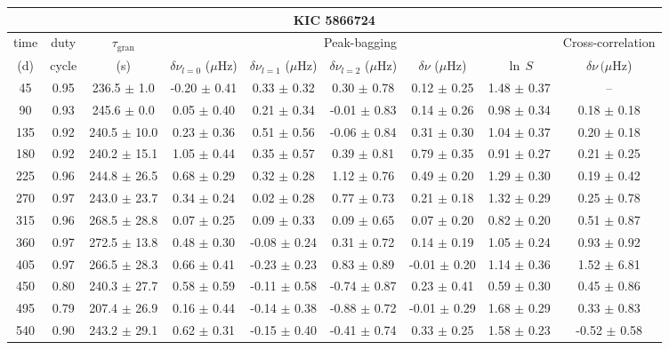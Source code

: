 \documentclass[twocolumn]{aastex61}%
\begin{document}
\begin{table}[ht]\centering\fontsize{9.}{7.}\selectfont
\begin{tabular}{ccc|ccccc|c}
\multicolumn{9}{c}{KIC 5866724}\\ \hline\hline
time & duty & $\tau_\text{gran}$ &\multicolumn{5}{c|}{Peak-bagging}&Cross-correlation\\
(d)& cycle & (s)&$\delta\nu_{l=0}$ ($\mu$Hz) & $\delta\nu_{l=1}$ ($\mu$Hz) & $\delta\nu_{l=2}$ ($\mu$Hz) & $\delta\nu$ ($\mu$Hz)& $\ln\,S$ & $\delta\nu\,(\mu$Hz)\\\hline
45 & 0.95 & 236.5 $\pm$ 1.0 & -0.20 $\pm$ 0.41 & 0.33 $\pm$ 0.32 & 0.30 $\pm$ 0.78 & 0.12 $\pm$ 0.25 & 1.48 $\pm$ 0.37 & --\\
90 & 0.93 & 245.6 $\pm$ 0.0 & 0.05 $\pm$ 0.40 & 0.21 $\pm$ 0.34 & -0.01 $\pm$ 0.83 & 0.14 $\pm$ 0.26 & 0.98 $\pm$ 0.34 & 0.18 $\pm$ 0.18\\
135 & 0.92 & 240.5 $\pm$ 10.0 & 0.23 $\pm$ 0.36 & 0.51 $\pm$ 0.56 & -0.06 $\pm$ 0.84 & 0.31 $\pm$ 0.30 & 1.04 $\pm$ 0.37 & 0.20 $\pm$ 0.18\\
180 & 0.92 & 240.2 $\pm$ 15.1 & 1.05 $\pm$ 0.44 & 0.35 $\pm$ 0.57 & 0.39 $\pm$ 0.81 & 0.79 $\pm$ 0.35 & 0.91 $\pm$ 0.27 & 0.21 $\pm$ 0.25\\
225 & 0.96 & 244.8 $\pm$ 26.5 & 0.68 $\pm$ 0.29 & 0.32 $\pm$ 0.28 & 1.12 $\pm$ 0.76 & 0.49 $\pm$ 0.20 & 1.29 $\pm$ 0.30 & 0.19 $\pm$ 0.42\\
270 & 0.97 & 243.0 $\pm$ 23.7 & 0.34 $\pm$ 0.24 & 0.02 $\pm$ 0.28 & 0.77 $\pm$ 0.73 & 0.21 $\pm$ 0.18 & 1.32 $\pm$ 0.29 & 0.25 $\pm$ 0.78\\
315 & 0.96 & 268.5 $\pm$ 28.8 & 0.07 $\pm$ 0.25 & 0.09 $\pm$ 0.33 & 0.09 $\pm$ 0.65 & 0.07 $\pm$ 0.20 & 0.82 $\pm$ 0.20 & 0.51 $\pm$ 0.87\\
360 & 0.97 & 272.5 $\pm$ 13.8 & 0.48 $\pm$ 0.30 & -0.08 $\pm$ 0.24 & 0.31 $\pm$ 0.72 & 0.14 $\pm$ 0.19 & 1.05 $\pm$ 0.24 & 0.93 $\pm$ 0.92\\
405 & 0.97 & 266.5 $\pm$ 28.3 & 0.66 $\pm$ 0.41 & -0.23 $\pm$ 0.23 & 0.83 $\pm$ 0.89 & -0.01 $\pm$ 0.20 & 1.14 $\pm$ 0.36 & 1.52 $\pm$ 6.81\\
450 & 0.80 & 240.3 $\pm$ 27.7 & 0.58 $\pm$ 0.59 & -0.11 $\pm$ 0.58 & -0.74 $\pm$ 0.87 & 0.23 $\pm$ 0.41 & 0.59 $\pm$ 0.30 & 0.45 $\pm$ 0.86\\
495 & 0.79 & 207.4 $\pm$ 26.9 & 0.16 $\pm$ 0.44 & -0.14 $\pm$ 0.38 & -0.88 $\pm$ 0.72 & -0.01 $\pm$ 0.29 & 1.68 $\pm$ 0.29 & 0.33 $\pm$ 0.83\\
540 & 0.90 & 243.2 $\pm$ 29.1 & 0.62 $\pm$ 0.31 & -0.15 $\pm$ 0.40 & -0.41 $\pm$ 0.74 & 0.33 $\pm$ 0.25 & 1.58 $\pm$ 0.23 & -0.52 $\pm$ 0.58\\

\end{tabular}
\end{table}
\end{document}
